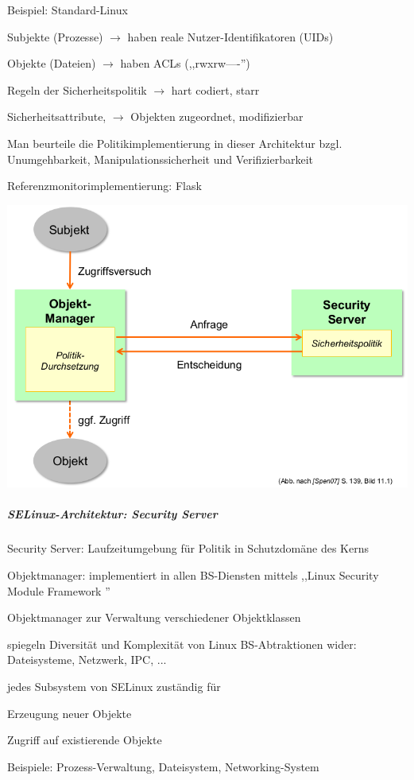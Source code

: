 \documentclass[a4paper]{article}
\begin{document}
\begin{multicols}{3}
    Beispiel: Standard-Linux
    \begin{itemize*}
        \item Subjekte (Prozesse) $\rightarrow$ haben reale Nutzer-Identifikatoren (UIDs)
        \item Objekte (Dateien) $\rightarrow$ haben ACLs (,,rwxrw----'')
        \item Regeln der Sicherheitspolitik $\rightarrow$ hart codiert, starr
        \item Sicherheitsattribute, $\rightarrow$ Objekten zugeordnet, modifizierbar
    \end{itemize*}
    Man beurteile die Politikimplementierung in dieser Architektur bzgl. Unumgehbarkeit, Manipulationssicherheit und Verifizierbarkeit

    Referenzmonitorimplementierung: Flask
    \begin{center}
        \includegraphics[width=.5\linewidth]{Assets/AdvancedOperatingSystems-referenzmonitor-flask.png}
    \end{center}

    \subparagraph{SELinux-Architektur: Security Server}
    \begin{itemize*}
        \item Security Server: Laufzeitumgebung für Politik in Schutzdomäne des Kerns
        \item Objektmanager: implementiert in allen BS-Diensten mittels ,,Linux Security Module Framework ''
        \item Objektmanager zur Verwaltung verschiedener Objektklassen
        \item spiegeln Diversität und Komplexität von Linux BS-Abtraktionen wider: Dateisysteme, Netzwerk, IPC, ...
        \item jedes Subsystem von SELinux zuständig für
        \begin{enumerate*}
            \item Erzeugung neuer Objekte
            \item Zugriff auf existierende Objekte
        \end{enumerate*}
        \item Beispiele: Prozess-Verwaltung, Dateisystem, Networking-System
    \end{itemize*}


\end{multicols}
\end{document}
